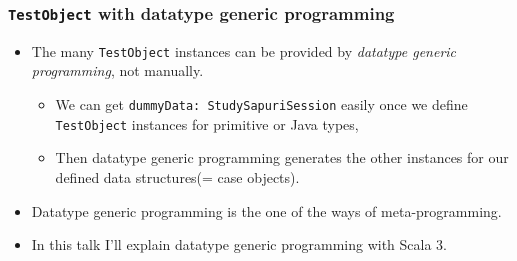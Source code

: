 \begin{frame}
  \frametitle{\lstinline|TestObject| with datatype generic programming}

  \begin{itemize}
    \item The many \lstinline|TestObject| instances can be provided by
    \emph{datatype generic programming}, not manually.
    \begin{itemize}
      \item We can get \lstinline|dummyData: StudySapuriSession| easily once we define
      \lstinline|TestObject| instances for primitive or Java types,
      \item Then datatype generic programming generates the other instances for our
      defined data structures(= case objects).
    \end{itemize}

    \item Datatype generic programming is the one of the ways of meta-programming.

    \item In this talk I'll explain datatype generic programming with Scala 3.
  \end{itemize}

\end{frame}

